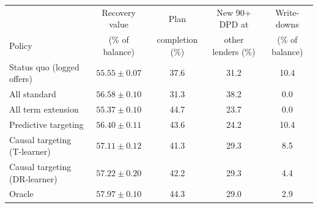 \begin{tabular}{lcccc}
\toprule
 & Recovery value & Plan & New 90+ DPD at & Write-downs \\
Policy & (\% of balance) & completion (\%) & other lenders (\%) & (\% of balance) \\
\midrule
Status quo (logged offers) & $55.55 \pm 0.07$ & 37.6 & 31.2 & 10.4 \\
\midrule
All standard & $56.58 \pm 0.10$ & 31.3 & 38.2 & 0.0 \\
All term extension & $55.37 \pm 0.10$ & 44.7 & 23.7 & 0.0 \\
\midrule
Predictive targeting & $56.40 \pm 0.11$ & 43.6 & 24.2 & 10.4 \\
Causal targeting (T-learner) & $57.11 \pm 0.12$ & 41.3 & 29.3 & 8.5 \\
Causal targeting (DR-learner) & $57.22 \pm 0.20$ & 42.2 & 29.3 & 4.4 \\
\midrule
Oracle & $57.97 \pm 0.10$ & 44.3 & 29.0 & 2.9 \\
\bottomrule
\end{tabular}
